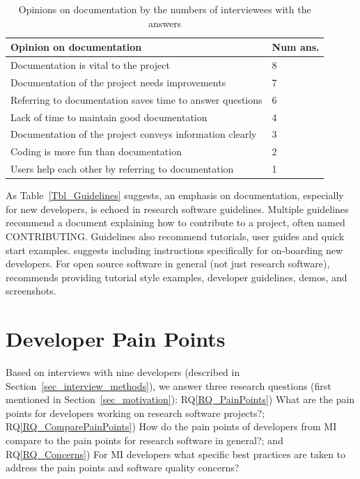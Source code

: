 \documentclass[final, 3p, times, authoryear]{elsarticle}
\newcommand{\rqref}[1]{RQ\ref{#1}}
\begin{document}
\begin{table}[!ht]
\centering
\begin{tabular}{ll}
\toprule
Opinion on documentation & Num ans. \\ 
\midrule
Documentation is vital to the project & 8 \\
Documentation of the project needs improvements & 7 \\
Referring to documentation saves time to answer questions & 6 \\
Lack of time to maintain good documentation & 4 \\
Documentation of the project conveys information clearly & 3 \\
Coding is more fun than documentation & 2 \\
Users help each other by referring to documentation & 1 \\ 
\bottomrule
\end{tabular}
\caption{Opinions on documentation by the numbers of interviewees with the
answers}
\label{tab_opinion_doc}
\end{table}

As Table~\ref{Tbl_Guidelines} suggests, an emphasis on documentation, especially
for new developers, is echoed in research software guidelines. Multiple
guidelines recommend a document explaining how to contribute to a project, often
named CONTRIBUTING. Guidelines also recommend tutorials, user guides and quick
start examples. \citet{SmithAndRoscoe2018} suggests including instructions
specifically for on-boarding new developers. For open source software in general
(not just research software), \citet{Fogel2005} recommends providing tutorial
style examples, developer guidelines, demos, and screenshots.

\section{Developer Pain Points} \label{painpoints}

Based on interviews with nine developers (described in
Section~\ref{sec_interview_methods}), we answer three research questions (first
mentioned in Section~\ref{sec_motivation}): \rqref{RQ_PainPoints}) What are the
pain points for developers working on research software projects?;
\rqref{RQ_ComparePainPoints}) How do the pain points of developers from MI
compare to the pain points for research software in general?; and
\rqref{RQ_Concerns}) For MI developers what specific best practices are taken to
address the pain points and software quality concerns? 
\end{document}
